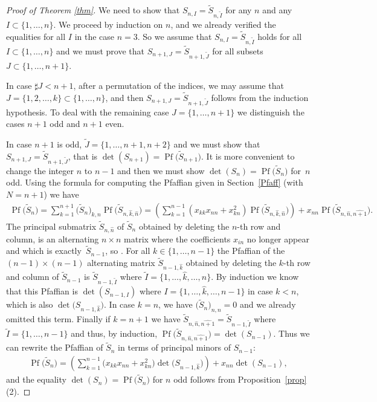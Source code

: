 \documentclass[10pt,a4paper]{amsart}
\newcommand{\tI}{{\tilde{I}}}
\newcommand{\tJ}{{\tilde{J}}}
\newcommand{\tS}{{\tilde{S}}}
\numberwithin{equation}{section}
\begin{document}
\begin{proof}[Proof of Theorem \ref{thm}] %
We need to show that $S_{n,I} = \tS_{n,\tI}$ for any $n$ and any $I \subset\{1,\ldots,n\}$. We proceed by induction on $n$, and we already verified the equalities for all $I$ in the case $n=3$. So we assume that $S_{n,I} = \tS_{n,\tI}$ holds for all $I\subset \{1,\ldots,n\}$ and we must prove that $S_{n+1,J} = \tS_{n+1,\tJ}$ for all subsets $J\subset\{1,\ldots,n+1\}$.

In case $\sharp J<n+1$, after a permutation of the indices, we may assume that $J=\{1,2,\ldots,k\}\subset\{1,\ldots,n\}$, and then $S_{n+1,J} = \tS_{n+1,\tJ}$ follows from the induction hypothesis. To deal with the remaining case $J=\{1,\ldots,n+1\}$ we distinguish the cases $n+1$ odd and $n+1$ even.

In case $n+1$ is odd, $\tilde{J}=\{1,\ldots,n+1,n+2\}$ and we must show that $S_{n+1,{J}}=\tS_{n+1,\tilde{J}}$, that is $\det(S_{n+1})=\operatorname{Pf}\big(\tS_{n+1}\big)$. It is more convenient to change the integer $n$ to $n-1$ and then we must show $\det(S_{n})=\operatorname{Pf}\big(\tS_{n}\big)$ for~$n$ odd. Using the formula for computing the Pfaffian given in Section~\ref{Pfaff} (with $N=n+1$) we have
\begin{gather*}
\operatorname{Pf}\big(\tS_{n}\big) = \sum_{k=1}^{n+1}\big(\tS_n\big)_{k,n}\operatorname{Pf}\big(\tS_{n,\hat{k},\hat{n}}\big)
 = \left(\sum_{k=1}^{n-1} (x_{kk}x_{nn}+x_{kn}^2)\operatorname{Pf}\big(\tS_{n,\hat{k},\hat{n}}\big)\right)
 + x_{nn}\operatorname{Pf}\big(\tS_{n,\hat{n},\widehat{n+1}}\big).
\end{gather*}
The principal submatrix $\tS_{n,\hat{n}}$ of $\tS_n$ obtained by deleting the $n$-th row and column, is an alterna\-ting $n\times n$ matrix where the coefficients $x_{in}$ no longer appear and which is exactly~$\tS_{n-1}$, so \smash{$\tS_{n,\hat{n}}=\tS_{n-1}$}. For all $k\in \{1,\ldots,n-1\}$ the Pfaffian of the $(n-1)\times (n-1)$ alter\-na\-ting matrix $\tS_{n-1,\hat{k}}$ obtained by deleting the $k$-th row and column of $\tS_{n-1}$ is $\tS_{n-1,\tI}$ where $\tI=\big\{1,\ldots,\hat{k},\ldots,n\big\}$. By induction we know that this Pfaffian is $\det(S_{n-1,I})$ where $I=\big\{1,\ldots,\hat{k},\ldots,n-1\big\}$ in case $k<n$, which is also $\det\big(S_{n-1,\hat{k}}\big)$. In case $k=n$, we have $\big(\tS_n\big)_{n,n}=0$ and we already omitted this term. Finally if $k=n+1$ we have $\tS_{n,\hat{n},\widehat{n+1}}=\tS_{n-1,\tI}$ where $\tI=\{1,\ldots,n-1\}$ and thus, by induction, $\operatorname{Pf}\big(\tS_{n,\hat{n},\widehat{n+1}}\big)=\det(S_{n-1})$. Thus we can rewrite the Pfaffian of $\tS_n$ in terms of principal minors of $S_{n-1}$:
\begin{gather*}
\operatorname{Pf}\big(\tS_{n}\big) =\left(\sum_{k=1}^{n-1} \big(x_{kk}x_{nn}+x_{kn}^2\big)\det\big(S_{n-1,\hat{k}}\big)\right) + x_{nn}\det(S_{n-1}),
\end{gather*}
and the equality $\det(S_n)=\operatorname{Pf}\big(\tS_{n}\big)$ for $n$ odd follows from Proposition~\ref{prop}(2).


\end{proof}
\end{document}
